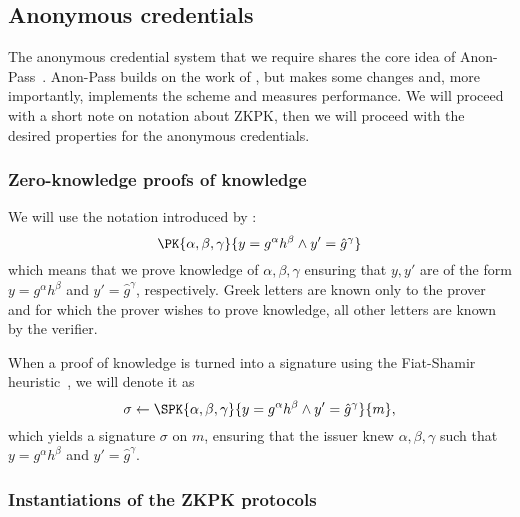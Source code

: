 \subsection{Anonymous credentials}%
\label{ZK-anon-cred}

The anonymous credential system that we require shares the core idea of 
Anon-Pass~\cite{AnonPass}.
Anon-Pass builds on the work of \citet{HowToWinTheCloneWars}, but makes some 
changes and, more importantly, implements the scheme and measures performance.
We will proceed with a short note on notation about \ac{ZKPK}, then we will 
proceed with the desired properties for the anonymous credentials.


\subsubsection{Zero-knowledge proofs of knowledge}%
\label{ZKPK}

We will use the notation introduced by \citet{PKnotation}:
\begin{equation}\label{PKexample}
  \PK{\alpha, \beta, \gamma}
  {y = g^\alpha h^\beta \land y' = \hat g^\gamma}
\end{equation}
which means that we prove knowledge of \(\alpha, \beta, \gamma\) ensuring that 
\(y, y'\) are of the form \(y = g^\alpha h^\beta\) and \(y' = \hat g^\gamma\), 
respectively.
Greek letters are known only to the prover and for which the prover wishes to 
prove knowledge, all other letters are known by the verifier.

When a proof of knowledge is turned into a signature using the Fiat-Shamir 
heuristic~\cite{FiatShamirHeuristic}, we will denote it as
\begin{equation*}\label{SPKexample}
  \sigma\gets \SPK{\alpha, \beta, \gamma}
  {y = g^\alpha h^\beta \land y' = \hat g^\gamma}
  {m},
\end{equation*}
which yields a signature \(\sigma\) on \(m\), ensuring that the issuer knew 
\(\alpha, \beta, \gamma\) such that \(y = g^\alpha h^\beta\) and \(y' = 
  \hat{g}^\gamma\).


\subsubsection{Instantiations of the \acs{ZKPK} protocols}


